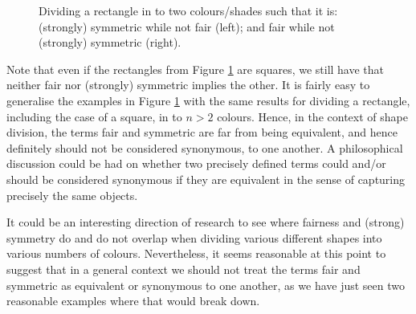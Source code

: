 \begin{figure}[!ht]
	\begin{center}
		\caption{Dividing a rectangle in to two colours/shades such that it is: (strongly) symmetric while not fair (left); and fair while not (strongly) symmetric (right).}
		\label{fig:cakecuts}
		\vspace{-0.5cm}
	\end{center}
\end{figure}	

Note that even if the rectangles from Figure \ref{fig:cakecuts} are squares, we still have that neither fair nor (strongly) symmetric implies the other. It is fairly easy to generalise the examples in Figure \ref{fig:cakecuts} with the same results for dividing a rectangle, including the case of a square, in to $n > 2$ colours. Hence, in the context of shape division, the terms fair and symmetric are far from being equivalent, and hence definitely should not be considered synonymous, to one another. A philosophical discussion could be had on whether two precisely defined terms could and/or should be considered synonymous if they are equivalent in the sense of capturing precisely the same objects.

It could be an interesting direction of research to see where fairness and (strong) symmetry do and do not overlap when dividing various different shapes into various numbers of colours. Nevertheless, it seems reasonable at this point to suggest that in a general context we should not treat the terms fair and symmetric as equivalent or synonymous to one another, as we have just seen two reasonable examples where that would break down.

